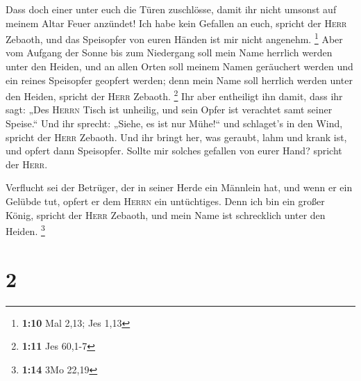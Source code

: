  Dass doch einer unter euch die Türen zuschlösse, damit
ihr nicht umsonst auf meinem Altar Feuer anzündet! Ich habe kein
Gefallen an euch, spricht der \textsc{Herr} Zebaoth, und das Speisopfer
von euren Händen ist mir nicht angenehm. \footnote{\textbf{1:10} Mal
  2,13; Jes 1,13}  Aber vom Aufgang der Sonne bis zum
Niedergang soll mein Name herrlich werden unter den Heiden, und an allen
Orten soll meinem Namen geräuchert werden und ein reines Speisopfer
geopfert werden; denn mein Name soll herrlich werden unter den Heiden,
spricht der \textsc{Herr} Zebaoth. \footnote{\textbf{1:11} Jes 60,1-7}
 Ihr aber entheiligt ihn damit, dass ihr sagt: „Des
\textsc{Herrn} Tisch ist unheilig, und sein Opfer ist verachtet samt
seiner Speise.``  Und ihr sprecht: „Siehe, es ist nur
Mühe!{}`` und schlaget's in den Wind, spricht der \textsc{Herr} Zebaoth.
Und ihr bringt her, was geraubt, lahm und krank ist, und opfert dann
Speisopfer. Sollte mir solches gefallen von eurer Hand? spricht der
\textsc{Herr}.

 Verflucht sei der Betrüger, der in seiner Herde ein
Männlein hat, und wenn er ein Gelübde tut, opfert er dem \textsc{Herrn}
ein untüchtiges. Denn ich bin ein großer König, spricht der
\textsc{Herr} Zebaoth, und mein Name ist schrecklich unter den Heiden.
\footnote{\textbf{1:14} 3Mo 22,19}

\hypertarget{section-1}{%
\section{2}\label{section-1}}

